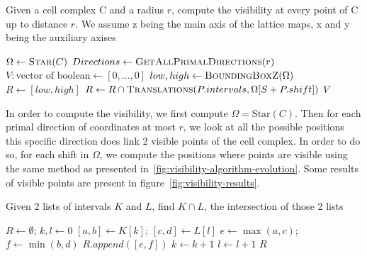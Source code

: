 \documentclass[runningheads]{llncs}
\begin{document}
    \begin{algorithm}
        \caption{Given a cell complex C and a radius $r$, compute the visibility at every point of C up to distance $r$. We assume z being the main axis of the lattice maps, x and y being the auxiliary axises}
        \label{alg:visibility}
        \begin{algorithmic}
                \State $\Omega \gets \Call{Star}{C}$ 
                \State $Directions \gets \Call{GetAllPrimalDirections}{r}$
                \State $V: \text{vector of boolean} \gets [0, \ldots, 0]$ 
                \State $low, high \gets \Call{BoundingBoxZ}{\Omega}$
                        \State $R \gets [low, high]$
                            \State $R \gets R \cap \Call{Translations}{P.intervals,\Omega[S + P.shift]}$
                        \EndFor
                        \State {}
                    \EndFor
                \EndFor
                \State \Return $V$
            \EndFunction
        \end{algorithmic}
    \end{algorithm}

    In order to compute the visibility, we first compute $\Omega = \text{Star}(C)$. Then for each primal direction of
    coordinates at most $r$, we look at all the possible positions this specific direction does link 2 visible points
    of the cell complex. In order to do so, for each shift in $\Omega$, we compute the positions where points are
    visible using the same method as presented in~\ref{fig:visibility-algorithm-evolution}. Some results of visible
    points are present in figure~\ref{fig:visibility-results}.

    \begin{algorithm}
        \caption{Given 2 lists of intervals $K$ and $L$, find $K \cap L$, the intersection of those 2 lists}
        \label{alg:intersection}
        \begin{algorithmic}
                \State $R \gets \emptyset$; $k, l \gets 0$
                    \State $[a,b] \gets K[k]$; $[c,d] \gets L[l]$
                    \State $e \gets \max(a, c)$; $f \gets \min(b, d)$
                        \State $R.append([e, f])$
                    \EndIf
                        \State $k \gets k+1$
                    \EndIf
                        \State $l \gets l+1$
                    \EndIf
                \EndWhile
                \State \Return $R$
            \EndFunction
        \end{algorithmic}
    \end{algorithm}
\end{document}
